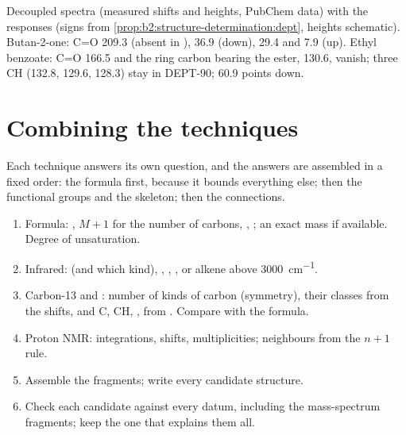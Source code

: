 \begin{omfigure}
{\small Decoupled  spectra (measured shifts and heights, PubChem data) with the 
responses (signs from \cref{prop:b2:structure-determination:dept}, heights schematic). Butan-2-one: C=O
209.3 (absent in ),  36.9 (down),  29.4 and 7.9 (up). Ethyl benzoate: C=O 166.5 and
the ring carbon bearing the ester, 130.6, vanish; three  CH (132.8, 129.6, 128.3) stay in
DEPT-90;  60.9 points down.}
\end{omfigure}

\section{Combining the techniques}

Each technique answers its own question, and the answers are assembled in a fixed order: the formula
first, because it bounds everything else; then the functional groups and the skeleton; then the
connections.

\begin{method}\label{met:b2:structure-determination:solve}
\begin{enumerate}
  \item Formula: , $M+1$ for the number of carbons, , ; an
        exact mass if available. Degree of unsaturation.
  \item Infrared:  (and which kind), , , ,  or alkene
         above \qty{3000}{cm^{-1}}.
  \item Carbon-13 and : number of kinds of carbon (symmetry), their classes from the shifts, and
        C, CH, ,  from . Compare with the formula.
  \item Proton NMR: integrations, shifts, multiplicities; neighbours from the $n + 1$ rule.
  \item Assemble the fragments; write every candidate structure.
  \item Check each candidate against every datum, including the mass-spectrum fragments; keep the one
        that explains them all.
\end{enumerate}
\end{method}

